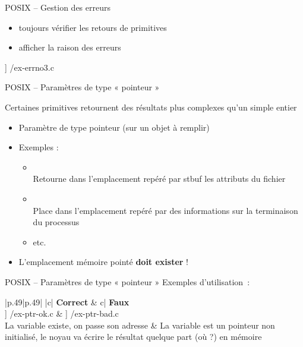\begin {frame} {POSIX -- Gestion des erreurs}
    \begin {block} {}
    \begin {itemize}
	\item \alert {toujours vérifier} les retours de primitives
	\item \alert {afficher} la raison des erreurs
    \end {itemize}
    \end {block}

    \fD\lstmonstyle] {\inc/ex-errno3.c}
\end {frame}

\begin {frame} {POSIX -- Paramètres de type « pointeur »}

    Certaines primitives retournent des résultats plus complexes
    qu'un simple entier

    \begin {itemize}
	\item Paramètre de type pointeur (sur un objet à remplir)
	\item Exemples :
	    \begin {itemize}
		\item {}
		    \\
		    Retourne dans l'emplacement repéré par \code
		    {\alert {stbuf}} les attributs du fichier
		\item {}
		    \\
		    Place dans l'emplacement repéré par  des informations sur la terminaison du
		    processus
		\item etc.
	    \end {itemize}

	\item L'emplacement mémoire pointé \textbf {doit exister} !
    \end {itemize}
\end {frame}

\begin {frame} {POSIX -- Paramètres de type « pointeur »}
    Exemples d'utilisation~:

    \ctableau {\fC} {|p{.49\textwidth}|p{.49\textwidth}|} {
	 {|c|} {\textbf {Correct}}
	    &  {c|} {\textbf {\alert {Faux}}}
	    \\ \hline
	\fE\lstmonstyle] {\inc/ex-ptr-ok.c}
	    &
	    \fE\lstmonstyle] {\inc/ex-ptr-bad.c}
	    \\
	La variable  existe, on passe son adresse
	    & La variable  est un pointeur non initialisé,
		le noyau va écrire le résultat quelque part (où ?) en
		mémoire
	    \\
    }

\end {frame}
